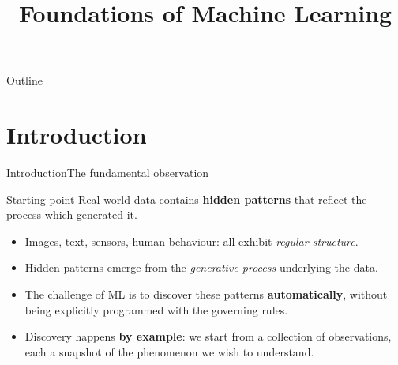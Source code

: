 
%

\title[Foundations of ML]{Foundations of Machine Learning}

%

\begin{frame}[plain]
  \titlepage
\end{frame}

\begin{frame}{Outline}
  \tableofcontents
\end{frame}

\section{Introduction}

\begin{frame}{Introduction}{The fundamental observation}
  \begin{block}{Starting point}
    Real-world data contains \textcolor{AccentBlue}{\textbf{hidden patterns}} that reflect
    the process which generated it.
  \end{block}
  \bigskip
  \begin{itemize}
    \item Images, text, sensors, human behaviour: all exhibit \emph{regular structure}.
    \item Hidden patterns emerge from the \emph{generative process} underlying the data.
    \item The challenge of ML is to discover these patterns \textbf{automatically}, without
          being explicitly programmed with the governing rules.
    \item Discovery happens \textcolor{AccentBlue}{\textbf{by example}}: we start from a
          collection of observations, each a snapshot of the phenomenon we wish to understand.
  \end{itemize}
\end{frame}

